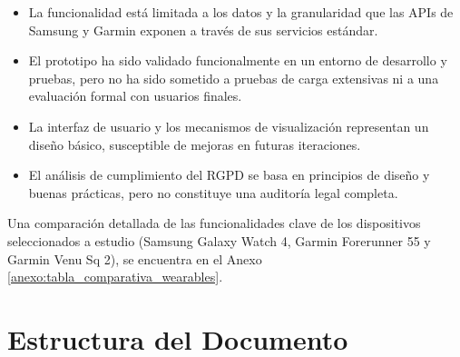 \begin{itemize}
    \item La funcionalidad está limitada a los datos y la granularidad que las APIs de Samsung y Garmin exponen a través de sus servicios estándar.
    \item El prototipo ha sido validado funcionalmente en un entorno de desarrollo y pruebas, pero no ha sido sometido a pruebas de carga extensivas ni a una evaluación formal con usuarios finales.
    \item La interfaz de usuario y los mecanismos de visualización representan un diseño básico, susceptible de mejoras en futuras iteraciones.
    \item El análisis de cumplimiento del RGPD se basa en principios de diseño y buenas prácticas, pero no constituye una auditoría legal completa.
\end{itemize}

Una comparación detallada de las funcionalidades clave de los dispositivos seleccionados a estudio (Samsung Galaxy Watch 4, Garmin Forerunner 55 y Garmin Venu Sq 2), se encuentra en el Anexo \ref{anexo:tabla_comparativa_wearables}.

\section{Estructura del Documento}


